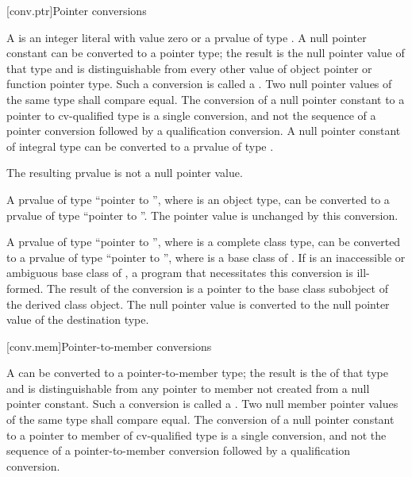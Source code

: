 [conv.ptr]{Pointer conversions}

\pnum
{}%
%
%
%
A  is an integer literal with
value zero
or a prvalue of type . A null pointer constant can be
converted to a pointer type; the
result is the null pointer value of that type and is
distinguishable from every other value of
object pointer or function pointer
type.
Such a conversion is called a .
Two null pointer values of the same type shall compare
equal. The conversion of a null pointer constant to a pointer to
cv-qualified type is a single conversion, and not the sequence of a
pointer conversion followed by a qualification
conversion. A null pointer constant of integral type
can be converted to a prvalue of type .
\begin{note}
The resulting prvalue is not a null pointer value.
\end{note}

\pnum
A prvalue of type ``pointer to \cv{} '', where 
is an object type, can be converted to a prvalue of type ``pointer to
\cv{} ''.
The pointer value is unchanged by this conversion.

\pnum
A prvalue of type ``pointer to \cv{} '', where 
is a complete class type, can be converted to a prvalue of type ``pointer to
\cv{} '', where  is a base class
of . If  is an
inaccessible or
ambiguous base class of , a program
that necessitates this conversion is ill-formed. The result of the
conversion is a pointer to the base class subobject of the derived class
object. The null pointer value is converted to the null pointer value of
the destination type.

[conv.mem]{Pointer-to-member conversions}

\pnum
{}%
%
%
A  can be converted to a
pointer-to-member
type; the result is the 
of that type and is distinguishable from any pointer to member not
created from a null pointer constant.
Such a conversion is called a .
Two null member pointer values of
the same type shall compare equal. The conversion of a null pointer
constant to a pointer to member of cv-qualified type is a single
conversion, and not the sequence of a pointer-to-member conversion
followed by a qualification conversion.


